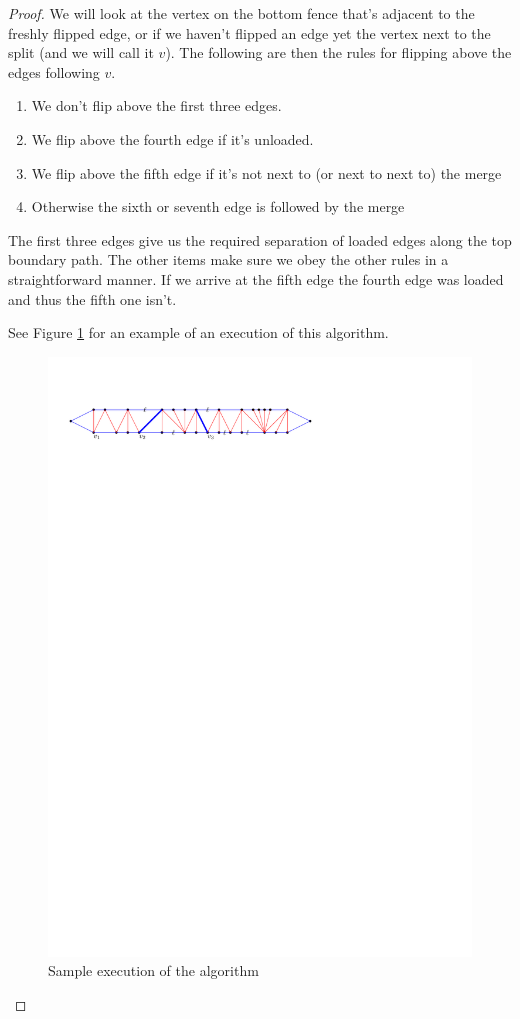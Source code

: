 \begin{proof}
  We will look at the vertex on the bottom fence that's adjacent to the freshly flipped edge,  or if we haven't flipped an edge yet the vertex next to the split (and we will call it $v$). The following are then the rules for flipping above the edges following $v$.
  \begin{enumerate}
    \item We don't flip above the first three edges.
    \item We flip above the fourth edge if it's unloaded.
    \item We flip above the fifth edge if it's not next to (or next to next to) the merge
    \item Otherwise the sixth or seventh edge is followed by the merge
  \end{enumerate}

The first three edges give us the required separation of loaded edges along the top boundary path. The other items make sure we obey the other rules in a straightforward manner. If we arrive at the fifth edge the fourth edge was loaded and thus the fifth one isn't.

See Figure \ref{fig:subdiv:sampleExecution} for an example of an execution of this algorithm.

\begin{figure}[h]
  \centering
  \includegraphics[scale=1]{blueFaceSubdivision/img/sampleExecution}
  \caption{Sample execution of the algorithm}
  \label{fig:subdiv:sampleExecution}
\end{figure}


\end{proof}
